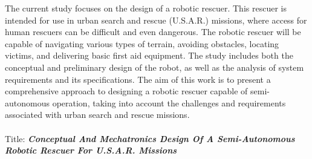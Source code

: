 The current study focuses on the design of a robotic rescuer. This rescuer is intended for use in urban search and rescue (U.S.A.R.) missions, where access for human rescuers can be difficult and even dangerous. The robotic rescuer will be capable of navigating various types of terrain, avoiding obstacles, locating victims, and delivering basic first aid equipment. The study includes both the conceptual and preliminary design of the robot, as well as the analysis of system requirements and its specifications. The aim of this work is to present a comprehensive approach to designing a robotic rescuer capable of semi-autonomous operation, taking into account the challenges and requirements associated with urban search and rescue missions.
\\
\\
Title: \textbf{\textit{Conceptual And Mechatronics Design Of A Semi-Autonomous Robotic Rescuer For U.S.A.R. Missions}}
